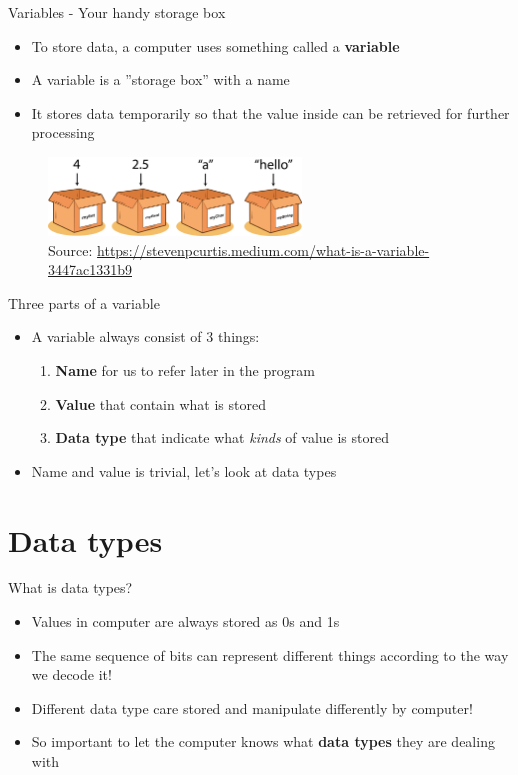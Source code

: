 \documentclass[10pt,xcolor={table,dvipsnames},t]{beamer}
\begin{document}
\begin{frame}{Variables - Your handy storage box}
  \begin{itemize}
    \item To store data, a computer uses something called a \textbf{variable}
    \item A variable is a ”storage box” with a name
    \item It stores data temporarily so that the value inside can be retrieved for further processing
  \end{itemize}
  \begin{figure}
    \centering 
    \includegraphics[width=0.6\textwidth]{img/variable.png}
    \caption*{Source: \href{https://stevenpcurtis.medium.com/what-is-a-variable-3447ac1331b9}{https://stevenpcurtis.medium.com/what-is-a-variable-3447ac1331b9}}
  \end{figure}
\end{frame}

\begin{frame}{Three parts of a variable}
  \begin{itemize}
    \item A variable always consist of 3 things:
    \begin{enumerate}
      \item \textbf{Name} for us to refer later in the program 
      \item \textbf{Value} that contain what is stored
      \item \textbf{Data type} that indicate what \textit{kinds} of value is stored
    \end{enumerate}
    \item Name and value is trivial, let's look at data types
  \end{itemize}
\end{frame}

\section{Data types}
\begin{frame}{What is data types?}
  \begin{itemize}
    \item Values in computer are always stored as 0s and 1s 
    \item The same sequence of bits can represent different things according to the way we decode it!
    \item Different data type care stored and manipulate differently by computer!
    \item So important to let the computer knows what \textbf{data types} they are dealing with
  \end{itemize}
\end{frame}
\end{document}
